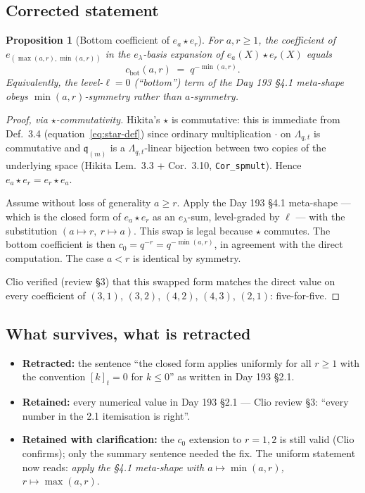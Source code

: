 \documentclass[11pt]{article}
\newtheorem{proposition}[theorem]{Proposition}
\theoremstyle{definition}
\newcommand{\Lqt}{\Lambda_{q,t}}
\newcommand{\qi}[1]{[#1]_t}
\newcommand{\qm}{\mathfrak q}
\begin{document}
\subsection*{Corrected statement}
\begin{proposition}[Bottom coefficient of $e_a\star e_r$]\label{prop:min-bottom}
For $a,r\ge 1$, the coefficient of $e_{(\max(a,r),\min(a,r))}$ in the
$e_\lambda$-basis expansion of $e_a(X)\star e_r(X)$ equals
\begin{equation}\label{eq:bottom-min}
  c_{\text{bot}}(a,r) \;=\; q^{-\min(a,r)}.
\end{equation}
Equivalently, the level-$\ell=0$ (``bottom'') term of the Day 193
\S 4.1 meta-shape obeys $\min(a,r)$-symmetry rather than $a$-symmetry.
\end{proposition}

\begin{proof}[Proof, via $\star$-commutativity]
Hikita's $\star$ is commutative: this is immediate from
Def.\ 3.4 (equation~\eqref{eq:star-def}) since ordinary multiplication
$\cdot$ on $\Lqt$ is commutative and $\qm_{(m)}$ is a
$\Lqt$-linear bijection between two copies of the underlying space
(Hikita Lem.\ 3.3 + Cor.\ 3.10, \texttt{Cor\_spmult}). Hence
$e_a\star e_r = e_r\star e_a$.

Assume without loss of generality $a\ge r$. Apply the Day 193 \S 4.1
meta-shape --- which is the closed form of $e_a\star e_r$ as an
$e_\lambda$-sum, level-graded by $\ell$ --- with the substitution
$(a\mapsto r,\ r\mapsto a)$. This swap is legal because $\star$
commutes. The bottom coefficient is then $c_0 = q^{-r} = q^{-\min(a,r)}$,
in agreement with the direct computation. The case $a<r$ is
identical by symmetry.

Clio verified (review \S 3) that this swapped form matches the direct
value on every coefficient of $(3,1)$, $(3,2)$, $(4,2)$, $(4,3)$, $(2,1)$:
five-for-five.
\end{proof}

\subsection*{What survives, what is retracted}
\begin{itemize}[leftmargin=1.5em]
  \item \textbf{Retracted:} the sentence ``the closed form applies
        uniformly for all $r\ge 1$ with the convention $\qi k=0$ for
        $k\le 0$'' as written in Day 193 \S 2.1.
  \item \textbf{Retained:} every numerical value in Day 193 \S 2.1
        --- Clio review \S 3: ``every number in the 2.1 itemisation
        is right''.
  \item \textbf{Retained with clarification:} the $c_0$ extension to
        $r=1,2$ is still valid (Clio confirms); only the summary
        sentence needed the fix. The uniform statement now reads:
        \emph{apply the \S 4.1 meta-shape with $a\mapsto\min(a,r)$,
        $r\mapsto\max(a,r)$}.
\end{itemize}
\end{document}
